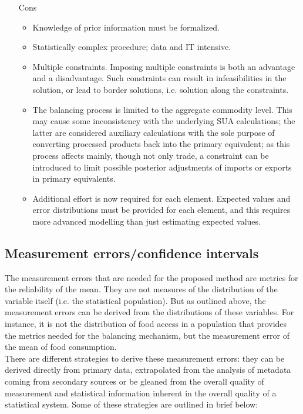 \documentclass[nojss]{jss}
\begin{document}
\begin{itemize}
\item[Cons]
\begin{itemize}
\item Knowledge of prior information must be formalized.
\item Statistically complex procedure; data and IT intensive.
\item Multiple constraints. Imposing multiple constraints is both an advantage and a disadvantage. Such constraints can result in infeasibilities in the solution, or lead to border solutions, i.e. solution along the constraints. 
\item The balancing process is limited to the aggregate commodity level. This may cause some inconsistency with the underlying SUA calculations; the latter are considered auxiliary calculations with the sole purpose of converting processed products back into the primary equivalent; as this process affects mainly, though not only trade, a constraint can be introduced to limit possible posterior adjustments of imports or exports in primary equivalents. 
\item Additional effort is now required for each element. Expected values and error distributions must be provided for each element, and this requires more advanced modelling than just estimating expected values.
\end{itemize}
\end{itemize}


\subsection{Measurement errors/confidence intervals }
The measurement errors that are needed for the proposed method are metrics for the reliability of the mean. They are not measures of the distribution of the variable itself (i.e. the statistical population). But as outlined above, the measurement errors can be derived from the distributions of these variables. For instance, it is not the distribution of food access in a population that provides the metrics needed for the balancing mechanism, but the measurement error of the mean of food consumption. \\
There are different strategies to derive these measurement errors: they can be derived directly from primary data, extrapolated from the analysis of metadata coming from secondary sources or be gleaned from the overall quality of measurement and statistical information inherent in the overall quality of a statistical system.  Some of these strategies are outlined in brief below:
\end{document}

